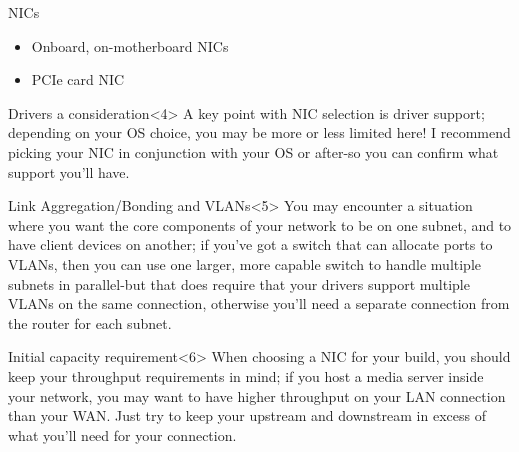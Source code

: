 \documentclass[bigger]{beamer}
\begin{document}
\begin{frame}[label={sec:orgfdc6a4f}]{NICs}
  \begin{itemize}
  \item<2-3> Onboard, on-motherboard NICs

  \item<3> PCIe card NIC
  \end{itemize}

\begin{block}{Drivers a consideration}<4>
A key point with NIC selection is driver support; depending on your OS choice,
you may be more or less limited here! I recommend picking your NIC in
conjunction with your OS or after-so you can confirm what support you'll
have.
\end{block}

\begin{block}{Link Aggregation/Bonding and VLANs}<5>
You may encounter a situation where you want the core components of your
network to be on one subnet, and to have client devices on another; if
you've got a switch that can allocate ports to VLANs, then you can use one
larger, more capable switch to handle multiple subnets in parallel-but that
does require that your drivers support multiple VLANs on the same
connection, otherwise you'll need a separate connection from the router for
each subnet.
\end{block}

\begin{block}{Initial capacity requirement}<6>
When choosing a NIC for your build, you should keep your throughput
requirements in mind; if you host a media server inside your network, you
may want to have higher throughput on your LAN connection than your
WAN. Just try to keep your upstream and downstream in excess of what you'll
need for your connection.
\end{block}
\end{frame}
\end{document}

